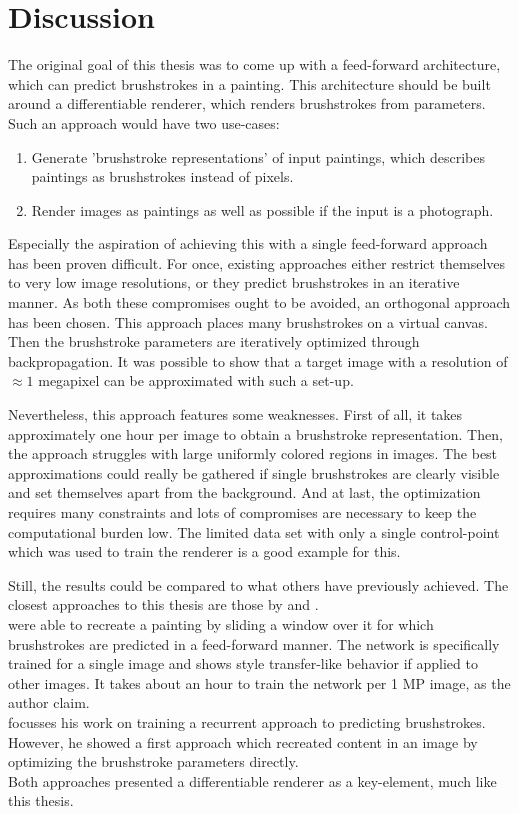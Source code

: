 \setchapterpreamble[u]{\margintoc}
\chapter{Discussion}

The original goal of this thesis was to come up with a feed-forward architecture, which can predict brushstrokes in a painting.
This architecture should be built around a differentiable renderer, which renders brushstrokes from parameters.
Such an approach would have two use-cases:
\begin{enumerate}
    \item Generate 'brushstroke representations' of input paintings, which describes paintings as brushstrokes instead of pixels.
    \item Render images as paintings as well as possible if the input is a photograph.
\end{enumerate}

Especially the aspiration of achieving this with a single feed-forward approach has been proven difficult.
For once, existing approaches either restrict themselves to very low image resolutions, or they predict brushstrokes in an iterative manner.
As both these compromises ought to be avoided, an orthogonal approach has been chosen.
This approach places many brushstrokes on a virtual canvas.
Then the brushstroke parameters are iteratively optimized through backpropagation.
It was possible to show that a target image with a resolution of $\approx 1$ megapixel can be approximated with such a set-up.

Nevertheless, this approach features some weaknesses.
First of all, it takes approximately one hour per image to obtain a brushstroke representation.
Then, the approach struggles with large uniformly colored regions in images.
The best approximations could really be gathered if single brushstrokes are clearly visible and set themselves apart from the background.
And at last, the optimization requires many constraints and lots of compromises are necessary to keep the computational burden low.
The limited data set with only a single control-point which was used to train the renderer is a good example for this.

Still, the results could be compared to what others have previously achieved.
The closest approaches to this thesis are those by \citeauthor*{LpaintB} and \citeauthor*{neuralpainters}.\\
\citeauthor*{LpaintB} were able to recreate a painting by sliding a window over it for which brushstrokes are predicted in a feed-forward manner.
The network is specifically trained for a single image and shows style transfer-like behavior if applied to other images.
It takes about an hour to train the network per 1 MP image, as the author claim.\\
\citeauthor*{neuralpainters} focusses his work on training a recurrent approach to predicting brushstrokes.
However, he showed a first approach which recreated content in an image by optimizing the brushstroke parameters directly.\\
Both approaches presented a differentiable renderer as a key-element, much like this thesis.

